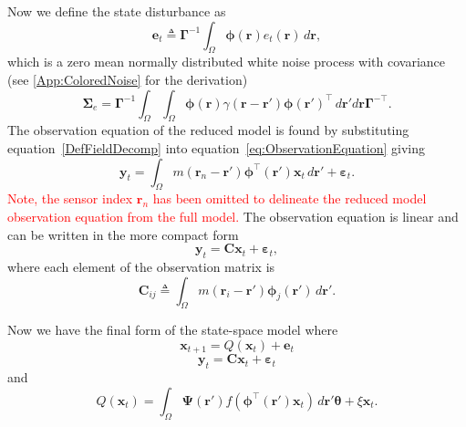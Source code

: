 \documentclass[review,authoryear,3p]{elsarticle}
\newcommand{\dean}[1]{\textcolor{red}{#1}}
\begin{document}
Now we define the state disturbance as
\begin{equation}\label{eq:Wt} 
	\mathbf{e}_t \triangleq \boldsymbol{\Gamma}^{-1}\int_\Omega {\boldsymbol{\phi} ( \mathbf{r} )e_t( \mathbf{r} ) \, d\mathbf{r}},
\end{equation}
which is a zero mean normally distributed white noise process with covariance (see \ref{App:ColoredNoise} for the derivation)
\begin{equation}
	\boldsymbol\Sigma_e =\mathbf{\Gamma}^{-1}\int_{\Omega}\int_{\Omega}\boldsymbol{\phi}\left(\mathbf r\right) \gamma\left(\mathbf r- \mathbf r' \right)\boldsymbol{\phi}\left(\mathbf r'\right)^{\top} \, d\mathbf r' d\mathbf r\mathbf{\Gamma}^{- \top}. 
\end{equation}
The observation equation of the reduced model is found by substituting equation~\ref{DefFieldDecomp} into equation~\ref{eq:ObservationEquation} giving
\begin{equation}\label{eq:ReducedObservationEquation}
	\mathbf{y}_t = \int_{\Omega}{m\left(\mathbf{r}_n-\mathbf{r}'\right)\boldsymbol{\phi}^{\top}\left(\mathbf{r'}\right) \mathbf{x}_t\, d\mathbf{r}'} + \boldsymbol{\varepsilon}_t. 
\end{equation}
\dean{Note, the sensor index $\mathbf{r}_n$ has been omitted to delineate the reduced model observation equation from the full model.} The observation equation is linear and can be written in the more compact form
\begin{equation}\label{ObservationEquation} 
	\mathbf{y}_t = \mathbf{C}\mathbf{x}_t + \boldsymbol{\varepsilon}_t,
\end{equation}
where each element of the observation matrix is 
\begin{equation}
	\mathbf{C}_{ij} \triangleq \int_{\Omega}m(\mathbf{r}_i - \mathbf{r}')\boldsymbol{\phi}_j(\mathbf{r}') \, d\mathbf{r}'.
\end{equation}

Now we have the final form of the state-space model where
\begin{equation}\label{eq:finalformstatespacemodel}
	\mathbf{x}_{t+1} = Q(\mathbf{x}_t) +\mathbf{e}_t
\end{equation}
\begin{equation} 
	\mathbf{y}_t = \mathbf{C}\mathbf{x}_t + \boldsymbol{\varepsilon}_t
\end{equation}
and 
\begin{equation}\label{eq:QmatrixForSigmapoints}
	Q(\mathbf{x}_t) = \int_\Omega \boldsymbol{\Psi}(\mathbf{r}') f(\boldsymbol{\phi}^{\top}(\mathbf{r}')\mathbf{x}_t) \, d\mathbf{r}' \boldsymbol{\theta} + \xi\mathbf{x}_t.
\end{equation}
\end{document}
